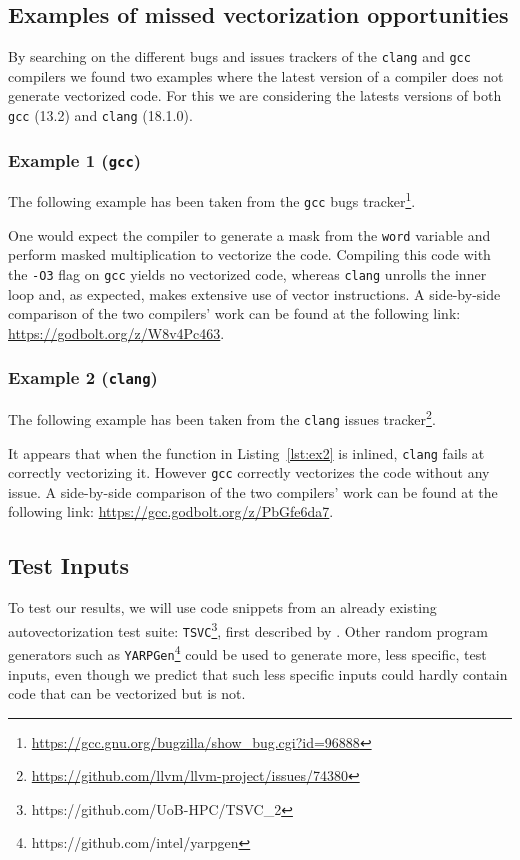 \documentclass[acmsmall,review, nonacm]{acmart}
\begin{document}
\subsection{Examples of missed vectorization opportunities} \label{examples}
By searching on the different bugs and issues trackers of the \texttt{clang} and \texttt{gcc} 
compilers we found two examples where the latest version of a compiler does not 
generate vectorized code. For this we are considering the latests versions of 
both \texttt{gcc} (13.2) and \texttt{clang} (18.1.0).

\subsubsection{Example 1 (\texttt{gcc})}
The following example has been taken from the \texttt{gcc} bugs tracker\footnote{\url{https://gcc.gnu.org/bugzilla/show_bug.cgi?id=96888}}.

One would expect the compiler to generate a mask from the \texttt{word} variable 
and perform masked multiplication to vectorize the code.
Compiling this code with the \texttt{-O3} flag on \texttt{gcc} yields no vectorized code, whereas \texttt{clang} unrolls the inner loop and, 
as expected, makes extensive use of vector instructions. A side-by-side comparison of the two compilers' work can be found 
at the following link: \url{https://godbolt.org/z/W8v4Pc463}.
% 

\subsubsection{Example 2 (\texttt{clang})}
The following example has been taken from the \texttt{clang} issues tracker\footnote{\url{https://github.com/llvm/llvm-project/issues/74380}}.

It appears that when the function in Listing~\ref{lst:ex2} is inlined, \texttt{clang} fails at correctly vectorizing it. However
\texttt{gcc} correctly vectorizes the code without any issue.
A side-by-side comparison of the two compilers' work can be found 
at the following link: \url{https://gcc.godbolt.org/z/PbGfe6da7}.

\subsection{Test Inputs}
To test our results, we will use code snippets from an already existing autovectorization test suite: \texttt{TSVC}\footnote{https://github.com/UoB-HPC/TSVC\_2}, first described by \citet{Callahan88}.
Other random program generators such as \texttt{YARPGen}\footnote{https://github.com/intel/yarpgen} could be used to generate more, less specific, test inputs, even though
we predict that such less specific inputs could hardly contain code that can be vectorized but is not.
\end{document}
